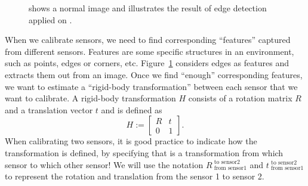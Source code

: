 \begin{figure}[htb]%
    \centering
        \hspace{8pt}
    \caption[]{ shows a normal image and
     illustrates the result of edge detection applied
on .}%
    \label{fig:EdgeDetection}%
\end{figure}



When we calibrate sensors, we need to find corresponding ``features'' captured from different sensors. Features are some specific structures in an environment, such as points, edges or corners, etc. Figure~\ref{fig:EdgeDetection} considers edges as features and extracts them out from an image. Once we find ``enough'' corresponding features, we want to estimate a ``rigid-body transformation'' between each sensor that we want to calibrate. A rigid-body transformation $H$ consists of a rotation matrix $R$ and a translation vector $t$ and is defined as
\begin{equation}
    H := 
    \begin{bmatrix}
    R & t\\
    0 & 1
    \end{bmatrix}.
\end{equation}
When calibrating two sensors, it is good practice to indicate how the transformation is defined, by specifying that is a transformation from which sensor to which other sensor! We will use the notation $R_{\text{~from sensor1}}^{\text{~to sensor2}}$ and $t_{\text{~from sensor1}}^{\text{~to sensor2}}$ 
to represent the rotation and translation from the sensor 1 to sensor 2. \\


